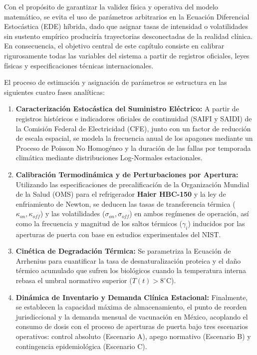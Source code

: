 \documentclass[
  spanish,
  us-letterpaper,
]{scrreprt}
\providecommand{\tightlist}{%
  \setlength{\itemsep}{0pt}\setlength{\parskip}{0pt}}
\numberwithin{equation}{section}
\theoremstyle{plain}
\theoremstyle{plain}
\theoremstyle{plain}
\theoremstyle{definition}
\theoremstyle{remark}
\begin{document}
Con el propósito de garantizar la validez física y operativa del modelo
matemático, se evita el uso de parámetros arbitrarios en la Ecuación
Diferencial Estocástica (EDE) híbrida, dado que asignar tasas de
intensidad o volatilidades sin sustento empírico produciría trayectorias
desconectadas de la realidad clínica. En consecuencia, el objetivo
central de este capítulo consiste en calibrar rigurosamente todas las
variables del sistema a partir de registros oficiales, leyes físicas y
especificaciones técnicas internacionales.

El proceso de estimación y asignación de parámetros se estructura en las
siguientes cuatro fases analíticas:

\begin{enumerate}
\def\labelenumi{\arabic{enumi}.}
\tightlist
\item
  \textbf{Caracterización Estocástica del Suministro Eléctrico:} A
  partir de registros históricos e indicadores oficiales de continuidad
  (SAIFI y SAIDI) de la Comisión Federal de Electricidad (CFE), junto
  con un factor de reducción de escala espacial, se modela la frecuencia
  anual de los apagones mediante un Proceso de Poisson No Homogéneo y la
  duración de las fallas por temporada climática mediante distribuciones
  Log-Normales estacionales.
\item
  \textbf{Calibración Termodinámica y de Perturbaciones por Apertura:}
  Utilizando las especificaciones de precalificación de la Organización
  Mundial de la Salud (OMS) para el refrigerador \textbf{Haier HBC-150}
  y la ley de enfriamiento de Newton, se deducen las tasas de
  transferencia térmica (\(\kappa_{on}, \kappa_{off}\)) y las
  volatilidades (\(\sigma_{on}, \sigma_{off}\)) en ambos regímenes de
  operación, así como la frecuencia y magnitud de los saltos térmicos
  (\(\gamma_i\)) inducidos por las aperturas de puerta con base en
  estudios experimentales del NIST.
\item
  \textbf{Cinética de Degradación Térmica:} Se parametriza la Ecuación
  de Arrhenius para cuantificar la tasa de desnaturalización proteica y
  el daño térmico acumulado que sufren los biológicos cuando la
  temperatura interna rebasa el umbral normativo superior
  (\(T(t) > 8^\circ\text{C}\)).
\item
  \textbf{Dinámica de Inventario y Demanda Clínica Estacional:}
  Finalmente, se establecen la capacidad máxima de almacenamiento, el
  punto de reorden jurisdiccional y la demanda mensual de vacunación en
  México, acoplando el consumo de dosis con el proceso de aperturas de
  puerta bajo tres escenarios operativos: control absoluto (Escenario
  A), apego normativo (Escenario B) y contingencia epidemiológica
  (Escenario C).
\end{enumerate}
\end{document}
